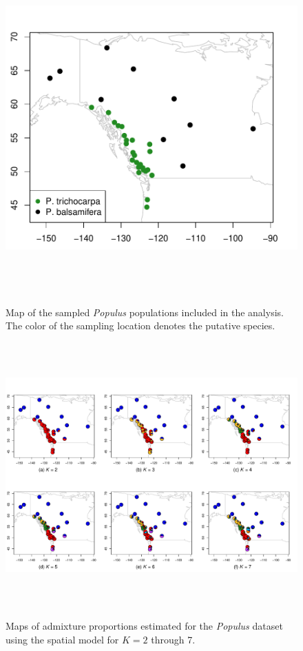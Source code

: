 \documentclass[10pt,letterpaper]{article}
\begin{document}
\begin{figure}
	\centering
		{\includegraphics[width=6in,height=5in]{figs/populus/populus_sampling_map.pdf}}
	\caption{
	Map of the sampled \textit{Populus} populations included in the analysis.
	The color of the sampling location denotes the putative species.
    }\label{populus_map}
\end{figure}

\begin{figure}
	\centering
		{\includegraphics[width=6in,height=4in]{figs/populus/populus_sp_pies.pdf}}
	\caption{
	Maps of admixture proportions estimated for the \textit{Populus} dataset 
	using the spatial model for $K=2$ through 7.
    }\label{populus_sp_pies}
\end{figure}
\end{document}
